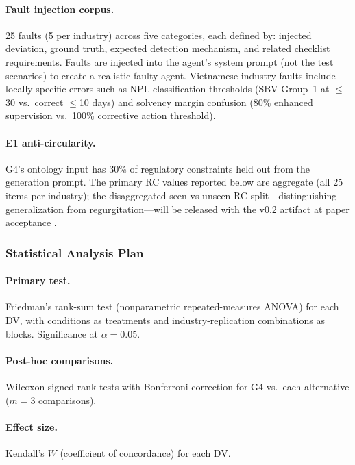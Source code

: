 \documentclass[11pt,a4paper]{article}
\begin{document}
\paragraph{Fault injection corpus.}
25 faults (5 per industry) across five categories, each defined by:
injected deviation, ground truth, expected detection mechanism, and
related checklist requirements. Faults are injected into the agent's
system prompt (not the test scenarios) to create a realistic faulty
agent. Vietnamese industry faults include locally-specific errors such
as NPL classification thresholds (SBV Group~1 at $\leq$30 vs.\
correct $\leq$10 days) and solvency margin confusion (80\% enhanced
supervision vs.\ 100\% corrective action threshold).

\paragraph{E1 anti-circularity.}
G4's ontology input has 30\% of regulatory constraints held out from
the generation prompt. The primary RC values reported below are
aggregate (all 25 items per industry); the disaggregated seen-vs-unseen
RC split---distinguishing generalization from regurgitation---will be
released with the v0.2 artifact at paper acceptance
\citep{faos-research-repo}.

\subsubsection{Statistical Analysis Plan}

\paragraph{Primary test.}
Friedman's rank-sum test (nonparametric repeated-measures ANOVA) for
each DV, with conditions as treatments and industry-replication
combinations as blocks. Significance at $\alpha = 0.05$.

\paragraph{Post-hoc comparisons.}
Wilcoxon signed-rank tests with Bonferroni correction for G4 vs.\
each alternative ($m = 3$ comparisons).

\paragraph{Effect size.}
Kendall's $W$ (coefficient of concordance) for each DV.
\end{document}

